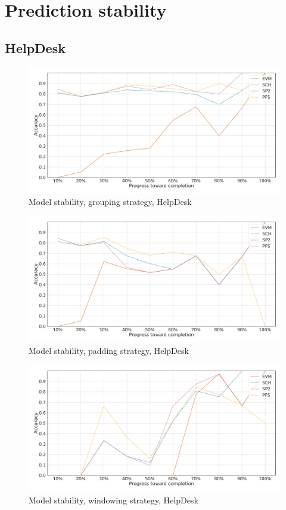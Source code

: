 \chapter{Prediction stability}
\label{appendix:evaluation-measurements}

\section*{HelpDesk}\label{appendix:stability:helpdesk}
\begin{figure}[!htb]
    \centering
    \includegraphics[width=\textwidth]{gfx/helpdesk/grouped_stability.pdf}
    \caption{Model stability, grouping strategy, HelpDesk}
    \label{fig:helpdesk-grouped-stability}
\end{figure}
\begin{figure}[!htb]
    \centering
    \includegraphics[width=\textwidth]{gfx/helpdesk/padded_stability.pdf}
    \caption{Model stability, padding strategy, HelpDesk}
    \label{fig:helpdesk-padded-stability}
\end{figure}
\begin{figure}[!htb]
    \centering
    \includegraphics[width=\textwidth]{gfx/helpdesk/windowed_stability.pdf}
    \caption{Model stability, windowing strategy, HelpDesk}
    \label{fig:helpdesk-windowed-stability}
\end{figure}
